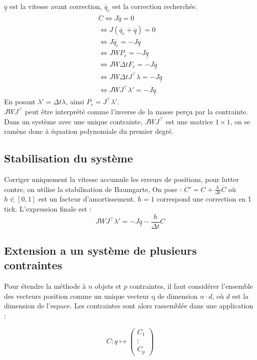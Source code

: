$\underline{\dot{q}}$ est la vitesse avant correction, $\dot{q_c}$ est la correction recherchée.
\begin{gather*}
    \dot{C} \Leftrightarrow J\dot{q} = 0\\
    \Leftrightarrow J(\dot{q_c} + \underline{\dot{q}}) = 0\\
    \Leftrightarrow J\dot{q_c} = -J\underline{\dot{q}}\\
    \Leftrightarrow J W P_c = -J\underline{\dot{q}}\\
    \Leftrightarrow J W \Delta t F_c = -J\underline{\dot{q}}\\
    \Leftrightarrow J W \Delta t J^\intercal \lambda = -J\underline{\dot{q}}\\
    \Leftrightarrow J W J^\intercal \lambda' = -J\underline{\dot{q}}
\end{gather*}
En posant $\lambda' = \Delta t \lambda$, ainsi $P_c = J^\intercal \lambda'$.\\
$JWJ^\intercal$ peut être interprété comme l'inverse de la masse perçu par la contrainte.
Dans un système avec une unique contrainte, $JWJ^\intercal$ est une matrice $1 \times 1$, on se ramène donc à équation polynomiale du premier degré.

\subsection{Stabilisation du système}\label{subsec:stabilisation-du-systeme}
Corriger uniquement la vitesse accumule les erreurs de positions, pour lutter contre, on utilise la stabilisation de Baumgarte, On pose :
$\dot{C}' = \dot{C} + \frac{h}{\Delta t} \dot{C}$ où $h \in [0, 1]$ est un facteur d'amortissement.
$h = 1$ correspond une correction en 1 tick.
L'expression finale est :
\[\boxed{J W J^\intercal \lambda' = -J\underline{\dot{q}} - \frac{h}{\Delta t} C}\]

\subsection{Extension a un système de plusieurs contraintes}\label{subsec:extension-a-un-systeme-de-plusieurs-contraintes}
Pour étendre la méthode à $n$ objets et $p$ contraintes, il faut considérer l'ensemble des vecteurs position comme un unique vecteur q de dimension $n \cdot d$,
où $d$ est la dimension de l'espace.
Les contraintes sont alors rassemblée dans une application :

\[C : q  \mapsto
\begin{pmatrix}
    C_1 \\
    \vdots \\
    C_p
\end{pmatrix}\]

